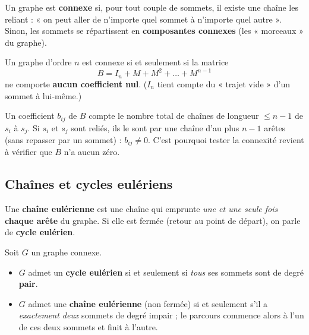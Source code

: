\begin{definition}
Un graphe est \textbf{connexe} si, pour tout couple de sommets, il existe une chaîne les
reliant : « on peut aller de n'importe quel sommet à n'importe quel autre ». Sinon, les
sommets se répartissent en \textbf{composantes connexes} (les « morceaux » du graphe).
\end{definition}

\begin{propriete}
Un graphe d'ordre $n$ est connexe si et seulement si la matrice
\[
B=I_n+M+M^2+\dots+M^{n-1}
\]
ne comporte \textbf{aucun coefficient nul}. ($I_n$ tient compte du « trajet vide » d'un
sommet à lui-même.)
\end{propriete}

\begin{remarque}
Un coefficient $b_{ij}$ de $B$ compte le nombre total de chaînes de longueur $\le n-1$ de
$s_i$ à $s_j$. Si $s_i$ et $s_j$ sont reliés, ils le sont par une chaîne d'au plus $n-1$
arêtes (sans repasser par un sommet) : $b_{ij}\ne0$. C'est pourquoi tester la connexité
revient à vérifier que $B$ n'a aucun zéro.
\end{remarque}

\subsection{Chaînes et cycles eulériens}

\begin{definition}
Une \textbf{chaîne eulérienne} est une chaîne qui emprunte \emph{une et une seule fois}
\textbf{chaque arête} du graphe. Si elle est fermée (retour au point de départ), on parle
de \textbf{cycle eulérien}.
\end{definition}

\begin{theoreme}
Soit $G$ un graphe connexe.
\begin{itemize}
\item $G$ admet un \textbf{cycle eulérien} si et seulement si \emph{tous} ses sommets sont
de degré \textbf{pair}.
\item $G$ admet une \textbf{chaîne eulérienne} (non fermée) si et seulement s'il a
\emph{exactement deux} sommets de degré impair ; le parcours commence alors à l'un de ces
deux sommets et finit à l'autre.
\end{itemize}
\end{theoreme}

